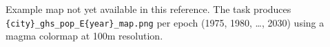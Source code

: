 \documentclass[
  letterpaper,
  DIV=11,
  numbers=noendperiod]{scrreprt}
\begin{document}
\begin{tcolorbox}[enhanced jigsaw, arc=.35mm, bottomrule=.15mm, breakable, colback=white, colframe=quarto-callout-note-color-frame, left=2mm, leftrule=.75mm, opacityback=0, rightrule=.15mm, toprule=.15mm]
\begin{minipage}[t]{5.5mm}
\textcolor{quarto-callout-note-color}{\faInfo}
\end{minipage}%
\begin{minipage}[t]{\textwidth - 5.5mm}

Example map not yet available in this reference. The task produces
\texttt{\{city\}\_ghs\_pop\_E\{year\}\_map.png} per epoch (1975, 1980,
\ldots, 2030) using a magma colormap at 100m resolution.

\end{minipage}%
\end{tcolorbox}
\end{document}
